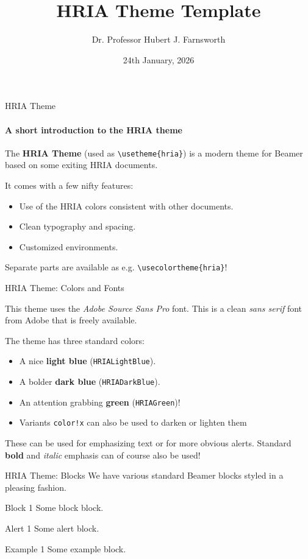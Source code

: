 \documentclass[aspectratio=169]{beamer}
\title{HRIA Theme Template}
\author[H. J. F.]{Dr. Professor Hubert J. Farnsworth}
\institute{Academy of Science, New New York}
\date{24th January, 2026}
\begin{document}
\titleframe

\begin{frame}{HRIA Theme}
\framesubtitle{A short introduction to the HRIA theme}

The \textbf{HRIA Theme} (used as \texttt{\textbackslash usetheme\{hria\}}) is a
modern theme for Beamer based on some exiting HRIA documents\footnotemark[1].

\bigskip
It comes with a few nifty features:
\begin{itemize}
    \item Use of the HRIA colors consistent with other documents.
    \item Clean typography and spacing.
    \item Customized environments.
\end{itemize}

\bigskip
Separate parts are available as e.g. \texttt{\textbackslash usecolortheme\{hria\}}!

\end{frame}

\begin{frame}{HRIA Theme: Colors and Fonts}

This theme uses the \emph{Adobe Source Sans Pro} font. This is a clean \emph{sans serif}
font from Adobe that is freely available.

\bigskip
The theme has three standard colors:
\begin{itemize}
    \item A nice \textcolor{HRIALightBlue}{\textbf{light blue}} (\texttt{HRIALightBlue}).
    \item A bolder \textcolor{HRIADarkBlue}{\textbf{dark blue}} (\texttt{HRIADarkBlue}).
    \item An attention grabbing \textcolor{HRIAGreen}{\textbf{green}}
    (\texttt{HRIAGreen})!
    \item Variants \texttt{color!x} can also be used to darken or lighten them
\end{itemize}

\bigskip
These can be used for emphasizing \textcolor{HRIALightBlue}{text} or for
more obvious \alert{alerts}. Standard \textbf{bold} and \textit{italic} emphasis
can of course also be used!
\end{frame}

\begin{frame}{HRIA Theme: Blocks}
We have various standard Beamer blocks styled in a pleasing fashion.

\begin{block}{Block 1}
Some block block.
\end{block}

\begin{alertblock}{Alert 1}
Some alert block.
\end{alertblock}

\begin{exampleblock}{Example 1}
Some example block.
\end{exampleblock}
\end{frame}
\end{document}
